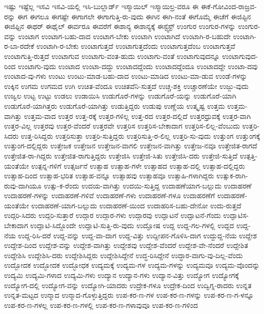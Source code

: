 {ಇಷ್ಟು
ಇಷ್ಟೆಲ್ಲ
ಇಸವಿ
ಇಸವಿ-ಯಲ್ಲಿ
ಇಸಿ-ಬುಲ್ಲಾರ್ಡ್
ಇಸ್ಮಾಯಿಲ್
ಇಸ್ಮಾಯಿಲ್ರ-ವರೂ
ಈ
ಈಕೆ-ಗೋವಿಂದ-ರಾಜ್ರವ-ರನ್ನು
ಈಗ
ಈಗಲೂ
ಈಗಷ್ಟೇ
ಈಗಾಗಲೇ
ಈಗಾಗುತ್ತಿ-ರು-ವುದು
ಈಗಿನ
ಈಗಿ-ನಂತೆ
ಈಗೊಮ್ಮೆ
ಈಚೆಗೆ
ಈಜಿಪ್ಟಿನ
ಈಜಿಫ್ಟಿನ
ಈಥರ್
ಈಥೈಲ್
ಈರ್ವರೂ
ಈವರೆಗೆ
ಈಶಾನ್ಯ
ಈಶಾನ್ಯಕ್ಕೆ
ಈಸ್ಟ್ವೆಸ್ಟ್
ಉಂಗುರ
ಉಂಗುರ-ಗಳನ್ನು
ಉಂಗುರ-ವನ್ನು
ಉಂಟಾಗ
ಉಂಟಾಗ-ಬಹು-ದಾದ
ಉಂಟಾಗ-ಬೇಕು
ಉಂಟಾಗಿ
ಉಂಟಾಗಿದೆ
ಉಂಟಾಗಿ-ರ-ಬಹುದೇ
ಉಂಟಾಗಿ-ರ-ಬಾ-ರದೇಕೆ
ಉಂಟಾಗಿ-ರ-ಬೇಕು
ಉಂಟಾಗುತ್ತದೆ
ಉಂಟಾಗುತ್ತದೆಂದು
ಉಂಟಾಗುತ್ತದೆಂಬ
ಉಂಟಾಗುತ್ತವೆ
ಉಂಟಾಗುತ್ತಿ-ರುತ್ತದೆ
ಉಂಟಾಗುವ
ಉಂಟಾಗು-ವಂತ-ಹುದು
ಉಂಟಾಗು-ವಂತೆ
ಉಂಟಾಗುವುದನ್ನೂ
ಉಂಟಾಗುವುದ-ರಿಂದ
ಉಂಟಾಗು-ವುದು
ಉಂಟಾದ
ಉಂಟಾ-ದದ್ದು
ಉಂಟಾದದ್ದೆಂದು
ಉಂಟಾದದ್ದೆಂದೂ
ಉಂಟಾದದ್ದೇ
ಉಂಟಾ-ದವು
ಉಂಟಾದ-ವು-ಗಳು
ಉಂಟು
ಉಂಟು-ಮಾಡ-ಬಹು-ದಾದ
ಉಂಟು-ಮಾಡಿದ
ಉಂಟು-ಮಾ-ಡುವ
ಉಂಡೆ-ಗಳನ್ನು
ಉಕ್ಕಿನ
ಉಗಮ
ಉಗಮದ
ಉಗಿ
ಉಚಿತ-ವೆಂದೂ
ಉಚಿತವೆನಿ-ಸುತ್ತದೆ
ಉಚ್ಚ-ಶಕ್ತಿ
ಉಚ್ಚಾರಣೆಯೇ
ಉಜ್ಜು-ವುದು
ಉಜ್ವಲ
ಉಟ್ಟ
ಉಟ್ಟು
ಉಡಲು
ಉಡಾಯಿಸಿ
ಉಡುಗೊರೆ-ಗಳನ್ನು
ಉಡುಗೊರೆ-ಯನ್ನು
ಉಡುಗೊರೆ-ಯಾಗಿ
ಉಡುಗೊರೆ-ಯಾಗಿತ್ತರು
ಉಡುಗೊರೆ-ಯಾಗಿತ್ತು
ಉಡುತ್ತಿದ್ದರು
ಉಡುಪು
ಉಣ್ಣೆಯ
ಉತ್ಕೃಷ್ಟ
ಉತ್ತಮ
ಉತ್ತಮ-ವಾಗಿತ್ತು
ಉತ್ತಮ-ವಾದ
ಉತ್ತರ
ಉತ್ತ-ರಕ್ಕೆ
ಉತ್ತರ-ಗಳಿಲ್ಲ
ಉತ್ತ-ರದ
ಉತ್ತರ-ದಲ್ಲಿದೆ
ಉತ್ತರಧ್ರುವಕ್ಕೆ
ಉತ್ತರ-ವಾಗಿ
ಉತ್ತರ-ವಿಲ್ಲ
ಉತ್ತರವು
ಉತ್ತರ-ವೆಂದರೆ
ಉತ್ತರವೇ
ಉತ್ತರಿಸ
ಉತ್ತರಿಸ-ಬೇಕಾದಾಗ
ಉತ್ತರಿಸ-ಲಿಲ್ಲ-ವೆಂಬುದು
ಉತ್ತರಿ-ಸಿದರು
ಉತ್ತ-ರಿಸಿದ್ದರು
ಉತ್ತರಿಸುತ್ತಾ
ಉತ್ತರಿ-ಸುತ್ತಿದ್ದರು
ಉತ್ತರಿಸುತ್ತಿ-ರ-ಲಿಲ್ಲ
ಉತ್ತರಿ-ಸು-ವುದು
ಉತ್ತುಂಗ
ಉತ್ತುಂಗಕ್ಕೆ
ಉತ್ತುಂಗ-ದಲ್ಲಿದ್ದರು
ಉತ್ತೇಜಕ
ಉತ್ತೇಜನ
ಉತ್ತೇಜನ-ವಾಗಲಿ
ಉತ್ತೇಜನ-ವಾಗಿತ್ತು
ಉತ್ತೇಜ-ನವೂ
ಉತ್ತೇಜಿತ-ರಾಗದೆ
ಉತ್ತೇಜಿತ-ರಾ-ಗಿದ್ದರು
ಉತ್ತೇಜಿತ-ರಾಗುತ್ತಿದ್ದರು
ಉತ್ತೇಜಿಸಿ
ಉತ್ತೇಜಿ-ಸಿತು
ಉತ್ತೇಜಿಸಿ-ದರು
ಉತ್ತೇಜಿ-ಸುತ್ತಿದೆ
ಉತ್ಪತ್ತಿ-ಯಂತೆಯೇ
ಉತ್ಪನ್ನ-ಗಳಿಗೆ
ಉತ್ಸರ್ಜನೆ
ಉತ್ಸಾಹ
ಉತ್ಸಾಹ-ಗಳೇ
ಉತ್ಸಾಹದ
ಉತ್ಸಾಹ-ದಲ್ಲಿ
ಉತ್ಸಾಹ-ದಲ್ಲಿದ್ದರು
ಉತ್ಸಾಹ-ದಿಂದ
ಉತ್ಸಾಹ-ಭರಿತ
ಉತ್ಸಾಹ-ವನ್ನೂ
ಉತ್ಸಾಹವು
ಉತ್ಸಾಹವೂ
ಉತ್ಸಾಹಿ-ಗಳಾಗಿದ್ದರು
ಉತ್ಸುಕ-ರಾಗಿ-ರುವು-ದಾಗಿಯೂ
ಉತ್ಸು-ಕ-ರೆಂದು
ಉದಯ-ವಾಗಿತ್ತು
ಉದಯಿ-ಸುತ್ತಿದ್ದ
ಉದಾಹಣೆಯಾಗ-ಬಲ್ಲುದು
ಉದಾಹರಣೆ
ಉದಾಹರಣೆ-ಗಳನ್ನು
ಉದಾಹರಣೆ-ಗಳಿವೆ
ಉದಾಹರಣೆ-ಗಳು
ಉದಾಹರಣೆ-ಗಳೂ
ಉದಾಹರಣೆಗೆ
ಉದಾಹರಣೆ-ಯಂತೆಯೇ
ಉದಾಹರಣೆ-ಯಾಗ-ಬಲ್ಲುದು
ಉದಾಹರಣೆ-ಯಿಂದ
ಉದಾಹರಿಸ-ಬಹು-ದೇನೋ
ಉದು-ರುತ್ತದೆ
ಉದ್ಗರಿ-ಸಿದರು
ಉದ್ಗರಿ-ಸುತ್ತಾರೆ
ಉದ್ಗಾರ
ಉದ್ಗಾರ-ಗಳು
ಉದ್ಗಾರವು
ಉದ್ಘಾಟನೆ
ಉದ್ಘಾಟನೆ-ಗೆಂದು
ಉದ್ಘಾಟಿಸ-ಬೇಕಾದಾಗ
ಉದ್ಘಾಟಿ-ಸಿದ್ದೊಂದೇ
ಉದ್ಘಾಟಿ-ಸುತ್ತಿ-ರು-ವುದು
ಉದ್ಘೋಷ
ಉದ್ದ
ಉದ್ದ-ಗಲ-ಗಳಲ್ಲಿ
ಉದ್ದದ
ಉದ್ದ-ನೆಯ
ಉದ್ದ-ರಿಸಿ-ದರೆ
ಉದ್ದ-ವನ್ನು
ಉದ್ದ-ವಾ-ದಾಗ
ಉದ್ದ-ವಿತ್ತು
ಉದ್ದೀಪನ-ಗೊಳಿಸಿ-ದಾಗ
ಉದ್ದುದ್ದ-ನೆಯ
ಉದ್ದೇಶ
ಉದ್ದೇಶ-ದಿಂದ
ಉದ್ದೇಶ-ವನ್ನು
ಉದ್ದೇಶ-ವಾಗಿತ್ತು
ಉದ್ದೇಶವು
ಉದ್ದೇಶ-ವೆಂದರೆ
ಉದ್ದೇಶ-ವೇ-ನೆಂದರೆ
ಉದ್ದೇಶಿತ
ಉದ್ದೇಶಿಸಿ
ಉದ್ದೇಶಿಸಿ-ದರು
ಉದ್ದೇಶಿಸಿದ್ದರು
ಉದ್ದೇಶಿಸಿದ್ದೇನೆ
ಉದ್ಧ-ರಿಸಿದ್ದೇನೆ
ಉದ್ಧಾರ-ವಾಗು-ವು-ದಿಲ್ಲ-ವೆಂದು
ಉದ್ಬೋದಕ
ಉದ್ಭೋದಕ
ಉದ್ಭೋಧಕ
ಉದ್ಯಮಕ್ಕೆ
ಉದ್ಯಮ-ಗಳ
ಉದ್ಯಮ-ಗಳನ್ನು
ಉದ್ಯಮವೂ
ಉದ್ಯಮ-ವೊಂದನ್ನು
ಉದ್ಯಮಿ
ಉದ್ಯಮಿ-ಗಳಾದ
ಉದ್ಯಮಿ-ಗಳು
ಉದ್ಯಾನ
ಉದ್ಯಾನ-ಗಳು
ಉದ್ಯಾನ-ವಿತ್ತು
ಉದ್ಯೋಗ
ಉದ್ಯೋಗಕ್ಕೆ
ಉದ್ಯೋಗ-ದಲ್ಲಿ
ಉದ್ಯೋಗ-ವನ್ನು
ಉದ್ಯೋಗಿ-ಯಾದರು
ಉದ್ರೇಕ-ಗಳೂ
ಉದ್ರೇಕ-ದಿಂದ
ಉದ್ವಿಗ್ನ-ರಾದರು
ಉನ್ನತ
ಉನ್ನತ-ಮಟ್ಟದ
ಉನ್ಮಾದ
ಉನ್ಮಾದ-ಗೊಳ್ಳುತ್ತಿದ್ದರು
ಉಪ-ಕರ-ಣ-ಗಳ
ಉಪ-ಕರ-ಣ-ಗಳನ್ನು
ಉಪ-ಕರ-ಣ-ಗ-ಳನ್ನೂ
ಉಪ-ಕರ-ಣ-ಗಳಲ್ಲ
ಉಪ-ಕರ-ಣ-ಗಳಲ್ಲಿ
ಉಪ-ಕರ-ಣ-ಗಳಾವುವೂ
ಉಪ-ಕರ-ಣ-ಗಳಿಂದ
}
